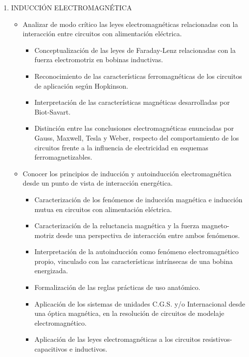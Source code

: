 \documentclass[planificacion2024.tex]{subfiles}
\begin{document}
\begin{enumerate}
\begin{itemize}
        \item Interpretar las teorías electrodinámicas eléctricas en una máquina rotativa.
    \end{itemize}
    \item INDUCCIÓN ELECTROMAGNÉTICA 
    \begin{itemize}
        \item Analizar de modo crítico las 
leyes electromagnéticas 
relacionadas con la interacción entre circuitos 
con alimentación eléctrica. 
    \begin{itemize}
        \item Conceptualización de las leyes de Faraday-Lenz 
relacionadas con la fuerza electromotriz en bobinas inductivas. 
        \item Reconocimiento de las características ferromagnéticas de 
los circuitos de aplicación según Hopkinson. 
\item Interpretación de las características magnéticas 
desarrolladas por Biot-Savart. 
\item Distinción entre las conclusiones electromagnéticas 
enunciadas por Gauss, Maxwell, Tesla y Weber, respecto 
del comportamiento de los circuitos frente a la influencia 
de electricidad en esquemas ferromagnetizables. 
    \end{itemize}
        \item Conocer los principios de 
inducción y autoinducción 
electromagnética desde un 
punto de vista de 
interacción energética. 
\begin{itemize}
    \item Caracterización de los fenómenos de inducción 
magnética e inducción mutua en circuitos con 
alimentación eléctrica. 
\item Caracterización de la reluctancia magnética y la fuerza 
magneto-motriz desde una perspectiva de interacción
entre ambos fenómenos. 
\item Interpretación de la autoinducción como fenómeno 
electromagnético propio, vinculado con las características 
intrínsecas de una bobina energizada. 
\item Formalización de las reglas prácticas de uso anatómico. 
\item Aplicación de los sistemas de unidades C.G.S. y/o
Internacional desde una óptica magnética, en la 
resolución de circuitos de modelaje electromagnético. 
\item Aplicación de las leyes electromagnéticas a los circuitos 
resistivos-capacitivos e inductivos. 
\end{itemize}
    

\end{itemize}
\end{enumerate}
\end{document}
